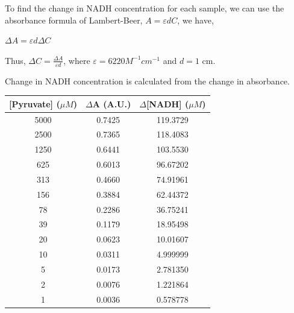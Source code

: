 \documentclass[a4paper,10pt]{article}
\begin{document}
                To find the change in NADH concentration for each sample, we can use the absorbance formula
                of Lambert-Beer, $A = \varepsilon d C$, we have,
                \begin{center}
                    $\Delta A = \varepsilon d \Delta C$
                \end{center}

                \begin{center}
                    Thus, $\Delta C = \frac{\Delta A}{\varepsilon d}$,
                    where $\varepsilon = 6220 M^{-1} cm^{-1}$ and $d = 1$ cm.
                \end{center}
                
                \noindent Change in NADH concentration is calculated from the change in absorbance.\\
                \begin{center}
                    \begin{tabular}{ c | c | c }
                        [Pyruvate] ($\mu M$) & $\Delta$A (A.U.) & $\Delta$[NADH] ($\mu M$) \\
                        \hline 
                        \hline 
                        5000 & 0.7425 & 119.3729 \\
                        2500 & 0.7365 & 118.4083 \\
                        1250 & 0.6441 & 103.5530 \\
                         625 & 0.6013 & 96.67202 \\
                         313 & 0.4660 & 74.91961 \\
                         156 & 0.3884 & 62.44372 \\
                          78 & 0.2286 & 36.75241 \\
                          39 & 0.1179 & 18.95498 \\
                          20 & 0.0623 & 10.01607 \\
                          10 & 0.0311 & 4.999999 \\
                           5 & 0.0173 & 2.781350 \\
                           2 & 0.0076 & 1.221864 \\
                           1 & 0.0036 & 0.578778 \\
                    \end{tabular}
                \end{center}
\end{document}
